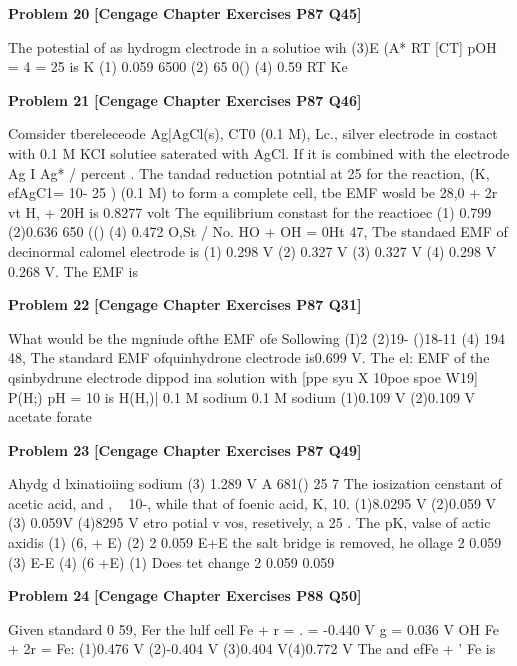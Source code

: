 \begin{problembox}
\textbf{Problem 20} \hfill \textbf{[Cengage Chapter Exercises P87 Q45]}
\label{q:ext-cng-th-20}

The potestial of as hydrogm clectrode in a solutioe wih
(3)E  (A*
RT
[CT]
pOH = 4 = 25  is
K
(1) 0.059
6500 (2)
65 0()
(4) 0.59
RT
Ke
\end{problembox}

\begin{problembox}
\textbf{Problem 21} \hfill \textbf{[Cengage Chapter Exercises P87 Q46]}
\label{q:ext-cng-th-21}

Comsider tbereleceode Ag|AgCl(s), CT0 (0.1 M), Lc., silver
electrode in costact with 0.1 M KCI solutiee saterated
with AgCl. If it is combined with the electrode Ag I Ag*
/ percent . The tandad reduction potntial at 25  for the reaction,
(K, efAgC1= 10- 25 )
(0.1 M) to form a complete cell, tbe EMF wosld be
28,0 + 2r vt H, + 20H is 0.8277 volt The
equilibrium constast for the reactioec
(1) 0.799
(2)0.636
650 (()
(4) 0.472
 O,St / No.  HO + OH = 0Ht
47, Tbe standaed EMF of decinormal calomel electrode is
(1) 0.298 V (2) 0.327 V (3) 0.327 V (4) 0.298 V
0.268 V. The EMF is
\end{problembox}

\begin{problembox}
\textbf{Problem 22} \hfill \textbf{[Cengage Chapter Exercises P87 Q31]}
\label{q:ext-cng-th-22}

What would be the mgniude ofthe EMF ofe Sollowing
(I)2
(2)19-
()18-11
(4) 194
48, The standard EMF ofquinhydrone clectrode is0.699 V. The
el:
EMF of the qsinbydrune electrode dippod ina solution with
[ppe syu X 10poe spoe W19]
P(H;)
pH = 10 is
H(H,)| 0.1 M sodium
0.1 M sodium
(1)0.109 V
(2)0.109 V
acetate
forate
\end{problembox}

\begin{problembox}
\textbf{Problem 23} \hfill \textbf{[Cengage Chapter Exercises P87 Q49]}
\label{q:ext-cng-th-23}

Ahydg d lxinatioiing sodium
(3) 1.289 V
A 681()
 25 7 The iosization censtant of acetic acid,  and , ~ 10-,
while that of foenic acid, K,  10.
(1)8.0295 V (2)0.059 V (3) 0.059V (4)8295 V
etro potial v   vos, resetively, a
25 . The pK, valse of actic axidis
(1)
(6, + E)
(2)
2   0.059
E+E
the salt bridge is removed, he ollage
2  0.059
(3)
E-E
(4)
(6 +E)
(1) Does tet change
2   0.059
0.059
\end{problembox}

\begin{problembox}
\textbf{Problem 24} \hfill \textbf{[Cengage Chapter Exercises P88 Q50]}
\label{q:ext-cng-th-24}

Given standard 0
59, Fer the lulf cell
Fe + r = .
 = -0.440 V
g  = 0.036 V
OH
Fe + 2r =  Fe:
(1)0.476 V (2)-0.404 V (3)0.404 V(4)0.772 V
The  and   efFe + '   Fe is
\end{problembox}


